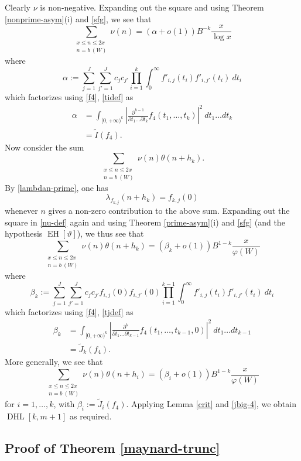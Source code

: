 \documentclass{bmcart}
\DeclareMathOperator*\EH{EH}
\DeclareMathOperator*\DHL{DHL}
\theoremstyle{plain}
\theoremstyle{definition}
\renewcommand{\phi}{\varphi}
\begin{document}
Clearly $\nu$ is non-negative.  Expanding out the square and using Theorem \ref{nonprime-asym}(i) and \eqref{sfg}, we see that
$$ \sum_{\substack{x \leq n \leq 2x\\ n = b\ (W)}} \nu(n) = (\alpha + o(1)) B^{-k} \frac{x}{\log x}$$
where
$$ \alpha := \sum_{j=1}^J \sum_{j'=1}^J c_j c_{j'} \prod_{i=1}^k \int_0^\infty f'_{i,j}(t_i) f'_{i,j'}(t_i)\ dt_i$$
which factorizes using \eqref{f4}, \eqref{tidef} as
\begin{align*}
\alpha &= \int_{[0,+\infty)^k} \left|\frac{\partial^{k-1}}{\partial t_1 \dots \partial t_k} f_4(t_1,\dots,t_k)\right|^2\ dt_1 \dots dt_k \\
&= \tilde I(f_4).
\end{align*}
Now consider the sum
$$ \sum_{\substack{x \leq n \leq 2x\\ n = b\ (W)}} \nu(n) \theta(n+h_k).$$
By \eqref{lambdan-prime}, one has
$$ \lambda_{f_{k,j}}(n+h_k) = f_{k,j}(0)$$
whenever $n$ gives a non-zero contribution to the above sum.  Expanding out the square in \eqref{nu-def} again and using Theorem \ref{prime-asym}(i) and \eqref{sfg} (and the hypothesis $\EH[\vartheta]$), we thus see that
$$ \sum_{\substack{x \leq n \leq 2x\\ n = b\ (W)}} \nu(n) \theta(n+h_k) = (\beta_k + o(1)) B^{1-k} \frac{x}{\phi(W)}$$
where
$$ \beta_k := \sum_{j=1}^J \sum_{j'=1}^J c_j c_{j'} f_{i,j}(0) f_{i,j'}(0) \prod_{i=1}^{k-1} \int_0^\infty f'_{i,j}(t_i) f'_{i,j'}(t_i)\ dt_i$$
which factorizes using \eqref{f4}, \eqref{tjdef} as
\begin{align*}
\beta_k &= \int_{[0,+\infty)^k} \left|\frac{\partial^k}{\partial t_1 \dots \partial t_{k-1}} f_4(t_1,\dots,t_{k-1},0)\right|^2\ dt_1 \dots dt_{k-1} \\
&= \tilde J_k(f_4).
\end{align*}
More generally, we see that
$$ \sum_{\substack{x \leq n \leq 2x\\ n = b\ (W)}} \nu(n) \theta(n+h_i) = (\beta_i + o(1)) B^{1-k} \frac{x}{\phi(W)}$$
for $i=1,\dots,k$, with $\beta_i := \tilde J_i(f_4)$.  Applying Lemma \ref{crit} and \eqref{jbig-4}, we obtain $\DHL[k,m+1]$ as required.

\subsection{Proof of Theorem \ref{maynard-trunc}}\label{trunc-sec}
\end{document}
